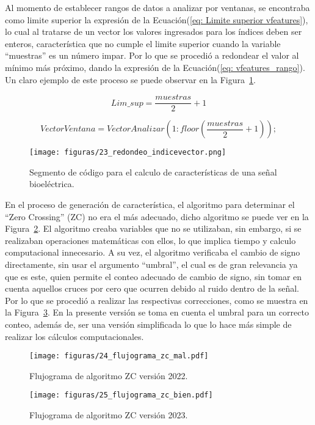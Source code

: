 Al momento de establecer rangos de datos a analizar por ventanas, se encontraba como limite superior la expresión de la Ecuación(\ref{eq: Limite superior vfeatures}), lo cual al tratarse de un vector los valores ingresados para los índices deben ser enteros, característica que no cumple el limite superior cuando la variable ``muestras'' es un número impar. Por lo que se procedió a redondear el valor al mínimo más próximo, dando la expresión de la Ecuación(\ref{eq: vfeatures_rango}). Un claro ejemplo de este proceso se puede observar en la Figura~\ref{fig: redondeo minimo}. 

\begin{equation}
    Lim\_sup = \frac{muestras}{2} + 1
    \label{eq: Limite superior vfeatures}
\end{equation}

\begin{equation}
    VectorVentana=VectorAnalizar(1:floor( \frac{muestras}{2} + 1));
    \label{eq: vfeatures_rango}
\end{equation}

\begin{figure}[H]
    \centering
    \texttt{[image: figuras/23\_redondeo\_indicevector.png]}
    \caption{Segmento de código para el calculo de características de una señal bioeléctrica.}
    \label{fig: redondeo minimo}
\end{figure}

En el proceso de generación de característica, el algoritmo para determinar el ``Zero Crossing'' (ZC) no era el más adecuado, dicho algoritmo se puede ver en la Figura~\ref{flu: ZC malo}. 
El algoritmo creaba variables que no se utilizaban, sin embargo, si se realizaban operaciones matemáticas con ellos, lo que implica tiempo y calculo computacional innecesario. A su vez, el algoritmo verificaba el cambio de signo directamente, sin usar el argumento ``umbral'', el cual es de gran relevancia ya que es este, quien permite el conteo adecuado de cambio de signo, sin tomar en cuenta aquellos cruces por cero que ocurren debido al ruido dentro de la señal. 
Por lo que se procedió a realizar las respectivas correcciones, como se muestra en la Figura~\ref{flu: ZC bueno}. En la presente versión se toma en cuenta el umbral para un correcto conteo, además de, ser una versión simplificada lo que lo hace más simple de realizar los cálculos computacionales.

\begin{figure}[H]
    \centering
    \texttt{[image: figuras/24\_flujograma\_zc\_mal.pdf]}
    \caption{Flujograma de algoritmo ZC versión 2022.}
    \label{flu: ZC malo}
\end{figure}
\begin{figure}[H]
    \centering
    \texttt{[image: figuras/25\_flujograma\_zc\_bien.pdf]}
    \caption{Flujograma de algoritmo ZC versión 2023.}
    \label{flu: ZC bueno}
\end{figure}

